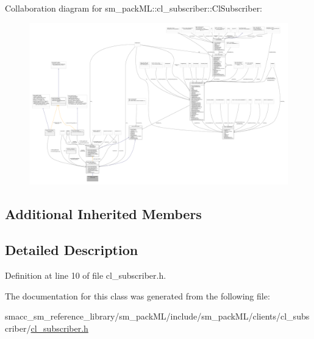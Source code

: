 Collaboration diagram for sm\+\_\+pack\+ML\+:\+:cl\+\_\+subscriber\+:\+:Cl\+Subscriber\+:
\nopagebreak
\begin{figure}[H]
\begin{center}
\leavevmode
\includegraphics[width=350pt]{classsm__packML_1_1cl__subscriber_1_1ClSubscriber__coll__graph}
\end{center}
\end{figure}
\subsection*{Additional Inherited Members}


\subsection{Detailed Description}


Definition at line 10 of file cl\+\_\+subscriber.\+h.



The documentation for this class was generated from the following file\+:\begin{DoxyCompactItemize}
\item 
smacc\+\_\+sm\+\_\+reference\+\_\+library/sm\+\_\+pack\+M\+L/include/sm\+\_\+pack\+M\+L/clients/cl\+\_\+subscriber/\hyperlink{sm__packML_2include_2sm__packML_2clients_2cl__subscriber_2cl__subscriber_8h}{cl\+\_\+subscriber.\+h}\end{DoxyCompactItemize}
